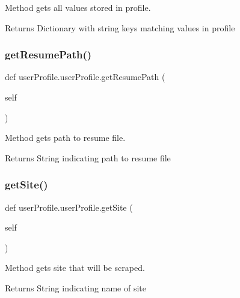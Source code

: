 Method gets all values stored in profile. 

\begin{DoxyReturn}{Returns}
Dictionary with string keys matching values in profile 
\end{DoxyReturn}
\mbox{\label{classuserProfile_1_1userProfile_aa89ac2871990f63c02a2bebb3393c979}} 
\subsubsection{\texorpdfstring{get\+Resume\+Path()}{getResumePath()}}
{\footnotesize\ttfamily def user\+Profile.\+user\+Profile.\+get\+Resume\+Path (\begin{DoxyParamCaption}\item[{}]{self }\end{DoxyParamCaption})}



Method gets path to resume file. 

\begin{DoxyReturn}{Returns}
String indicating path to resume file 
\end{DoxyReturn}
\mbox{\label{classuserProfile_1_1userProfile_afa86adbeac8ea685d8c9f1d343f734fd}} 
\subsubsection{\texorpdfstring{get\+Site()}{getSite()}}
{\footnotesize\ttfamily def user\+Profile.\+user\+Profile.\+get\+Site (\begin{DoxyParamCaption}\item[{}]{self }\end{DoxyParamCaption})}



Method gets site that will be scraped. 

\begin{DoxyReturn}{Returns}
String indicating name of site 
\end{DoxyReturn}
\mbox{\label{classuserProfile_1_1userProfile_ab2a8462b4239f832cdc0bc774ca60968}} 
